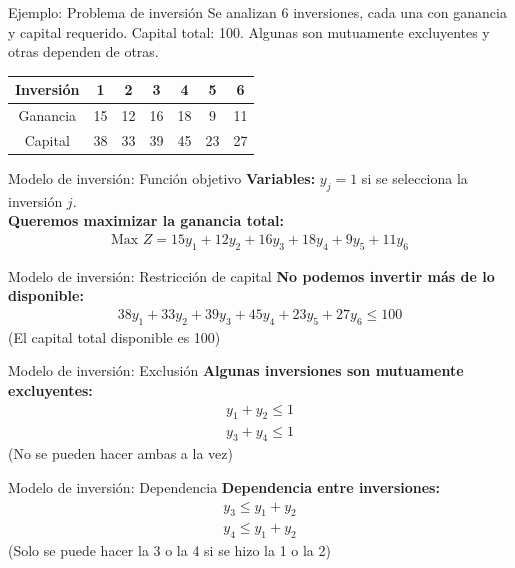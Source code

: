 \documentclass{beamer}
\begin{document}
\begin{frame}{Ejemplo: Problema de inversión}
    Se analizan 6 inversiones, cada una con ganancia y capital requerido. Capital total: 100. Algunas son mutuamente excluyentes y otras dependen de otras.
    \begin{table}[H]
        \centering
        \begin{tabular}{c|cccccc}
            \toprule
            Inversión & 1 & 2 & 3 & 4 & 5 & 6 \\
            \midrule
            Ganancia & 15 & 12 & 16 & 18 & 9 & 11 \\
            Capital & 38 & 33 & 39 & 45 & 23 & 27 \\
            \bottomrule
        \end{tabular}
    \end{table}
\end{frame}

\begin{frame}{Modelo de inversión: Función objetivo}
    \textbf{Variables:} $y_j = 1$ si se selecciona la inversión $j$.
    \\[0.5em]
    \textbf{Queremos maximizar la ganancia total:}
    \begin{align*}
        \text{Max } Z = 15y_1 + 12y_2 + 16y_3 + 18y_4 + 9y_5 + 11y_6
    \end{align*}
\end{frame}

\begin{frame}{Modelo de inversión: Restricción de capital}
    \textbf{No podemos invertir más de lo disponible:}
    \begin{align*}
        38y_1 + 33y_2 + 39y_3 + 45y_4 + 23y_5 + 27y_6 \leq 100
    \end{align*}
    (El capital total disponible es 100)
\end{frame}

\begin{frame}{Modelo de inversión: Exclusión}
    \textbf{Algunas inversiones son mutuamente excluyentes:}
    \begin{align*}
        y_1 + y_2 \leq 1 \\
        y_3 + y_4 \leq 1
    \end{align*}
    (No se pueden hacer ambas a la vez)
\end{frame}

\begin{frame}{Modelo de inversión: Dependencia}
    \textbf{Dependencia entre inversiones:}
    \begin{align*}
        y_3 \leq y_1 + y_2 \\
        y_4 \leq y_1 + y_2
    \end{align*}
    (Solo se puede hacer la 3 o la 4 si se hizo la 1 o la 2)
\end{frame}
\end{document}
